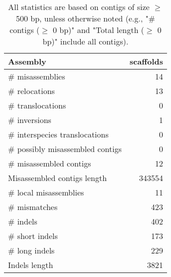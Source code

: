 \documentclass[12pt,a4paper]{article}
\begin{document}
\begin{table}[ht]
\begin{center}
\caption{All statistics are based on contigs of size $\geq$ 500 bp, unless otherwise noted (e.g., "\# contigs ($\geq$ 0 bp)" and "Total length ($\geq$ 0 bp)" include all contigs).}
\begin{tabular}{|l*{1}{|r}|}
\hline
Assembly & scaffolds \\ \hline
\# misassemblies & 14 \\ \hline
\hspace{5mm}\# relocations & 13 \\ \hline
\hspace{5mm}\# translocations & 0 \\ \hline
\hspace{5mm}\# inversions & 1 \\ \hline
\hspace{5mm}\# interspecies translocations & 0 \\ \hline
\# possibly misassembled contigs & 0 \\ \hline
\# misassembled contigs & 12 \\ \hline
Misassembled contigs length & 343554 \\ \hline
\# local misassemblies & 11 \\ \hline
\# mismatches & 423 \\ \hline
\# indels & 402 \\ \hline
\hspace{5mm}\# short indels & 173 \\ \hline
\hspace{5mm}\# long indels & 229 \\ \hline
Indels length & 3821 \\ \hline
\end{tabular}
\end{center}
\end{table}
\end{document}
